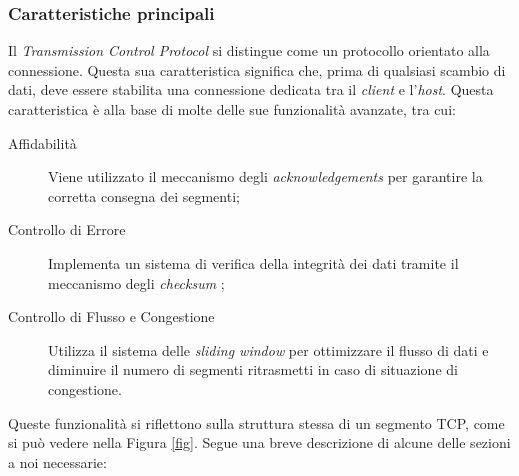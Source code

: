 \subsubsection{ Caratteristiche principali} 
\indent Il \emph{Transmission Control Protocol} si distingue come un protocollo orientato alla connessione. Questa sua caratteristica significa che, prima di qualsiasi scambio di dati, deve essere stabilita una connessione dedicata tra il \emph{client \glsfirstoccur} e l'\emph{host\glsfirstoccur}.
Questa caratteristica è alla base di molte delle sue funzionalità avanzate, tra cui:
\begin{description}
    \item[Affidabilità] Viene utilizzato il meccanismo degli \emph{acknowledgements} \glsfirstoccur per garantire la corretta consegna dei segmenti;

    \item[Controllo di Errore] Implementa un sistema di verifica della integrità dei dati tramite il meccanismo degli \emph{checksum} \glsfirstoccur;
    
    \item[Controllo di Flusso e Congestione] Utilizza il sistema delle \emph{sliding window} \glsfirstoccur per ottimizzare il flusso di dati e diminuire il numero di segmenti ritrasmetti in caso di situazione di congestione.
\end{description}

Queste funzionalità si riflettono sulla struttura stessa di un segmento TCP, come si può vedere nella Figura \ref{fig}. Segue una breve descrizione di alcune delle sezioni a noi necessarie:

